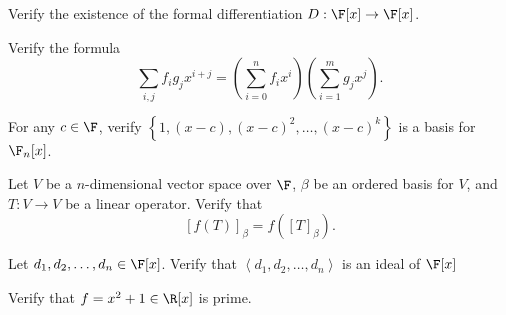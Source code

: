 \documentclass[linearalgebraII]{subfiles}
\begin{document}

    \begin{exercise}
        Verify the existence of the formal differentiation $D: \F[x]\to \F[x]$.
    \end{exercise}

    \begin{exercise}
        Verify the formula
        \begin{equation*}
            \sum_{i,j} f_ig_jx^{i+j} = \left( \sum^n_{i=0}f_ix^i \right) \left( \sum^m_{i=1} g_jx^j \right).
        \end{equation*}
    \end{exercise}

    \begin{exercise}
        For any $c\in \F$, verify $\left\lbrace 1, (x-c), (x-c)^2, \ldots, (x-c)^k \right\rbrace$ is a basis for $\F_n[x]$.
    \end{exercise}

    \begin{exercise}
        Let $V$ be a $n$-dimensional vector space over $\F$, $\beta$ be an ordered basis for $V$, and $T:V\to V$ be a linear operator. Verify that
        \begin{equation*}
            \left[ f(T) \right]_\beta = f \left( \left[ T \right]_\beta \right).         
        \end{equation*}
    \end{exercise}

    \begin{exercise}
        Let $d_1, d_2, \ldots, d_n\in \F[x]$. Verify that $\left<d_1, d_2, \ldots, d_n\right>$ is an ideal of $\F[x]$
    \end{exercise}

    \begin{exercise}
        Verify that $f = x^2 + 1\in \R[x]$ is prime.
    \end{exercise}
\end{document}
